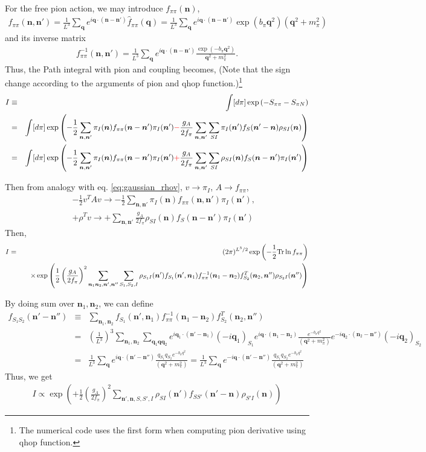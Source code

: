 \documentclass[10pt]{book}
\def\bm{\boldsymbol}
\newcommand{\bea}{\begin{eqnarray}}
\newcommand{\eea}{\end{eqnarray}}
\newcommand{\no}{\nonumber \\}
\def\vn{{\bm n}}
\def\vq{{\bm q}}
\begin{document}
For the free pion action, we may introduce $f_{\pi\pi}(\vn)$,
\bea 
f_{\pi\pi}(\vn,\vn')=\frac{1}{L^3}\sum_\vq e^{i\vq\cdot(\vn-\vn')} \hat{f}_{\pi\pi}(\vq)=
                \frac{1}{L^3}\sum_\vq e^{i\vq\cdot(\vn-\vn')} \exp(b_\pi \vq^2)(\vq^2+m_\pi^2)
\eea 
and its inverse matrix
\bea 
f^{-1}_{\pi\pi}(\vn,\vn')=\frac{1}{L^3}\sum_\vq e^{i\vq\cdot(\vn-\vn')} \frac{\exp(-b_\pi \vq^2)}{\vq^2+m_\pi^2}.
\eea 
Thus, the Path integral with pion and coupling becomes, (Note that the sign change according to the 
arguments of pion and qhop function.)\footnote{
The numerical code uses the first form when computing pion derivative using qhop function.}
\bea  
I&\equiv&\int [d\pi] \exp\left(-S_{\pi\pi}-S_{\pi N}\right) \no 
 &=&  \int [d\pi] \exp\left(-\frac{1}{2}\sum_{\vn,\vn'}\pi_I(\vn)f_{\pi\pi}(\vn-\vn')\pi_I(\vn')
{\color{red} -}\frac{g_A}{2f_\pi}\sum_{\vn,\vn'}\sum_{SI} \pi_I(\vn') f_S(\vn'-\vn)  \rho_{SI}(\vn) 
\right) \no 
  &=& \int [d\pi] \exp\left(-\frac{1}{2}\sum_{\vn,\vn'}\pi_I(\vn)f_{\pi\pi}(\vn-\vn')\pi_I(\vn')
{\color{red} +}\frac{g_A}{2f_\pi}\sum_{\vn,\vn'}\sum_{SI}\rho_{SI}(\vn)f_S(\vn-\vn')\pi_I(\vn')   
\right)
\eea 

Then from analogy with eq. \eqref{eq:gaussian_rhov}, $v\to \pi_I$, $A\to f_{\pi\pi}$,
\bea 
& &-\frac{1}{2}  v^T A v\to -\frac{1}{2} \sum_{\vn,\vn'} \pi_I(\vn) f_{\pi\pi}(\vn,\vn') \pi_I(\vn'),\no 
& &+\rho^T v \to +\sum_{\vn,\vn'} \frac{g_A}{2f_\pi} \rho_{SI}(\vn) f_S(\vn-\vn')\pi_I(\vn') 
\eea 
Then,
\bea 
I &=& (2\pi)^{L^3/2} \exp\left(-\frac{1}{2}{\rm Tr}\ln f_{\pi\pi}\right) 
       \no & &\quad \times 
      	  \exp\left( \frac{1}{2} \left(\frac{g_A}{2f_\pi}\right)^2 \sum_{\vn_1\vn_2,\vn',\vn''}
      	     \sum_{S_1,S_2,I}     	    
      	        \rho_{S_1 I}(\vn')f_{S_1}(\vn',\vn_1)f^{-1}_{\pi\pi}(\vn_1-\vn_2)
      	  	   f^T_{S_2}(\vn_2,\vn'')\rho_{S_2 I}(\vn'') \right) \nonumber 
\eea 

By doing sum over $\vn_1,\vn_2$, we can define
\bea 
f_{S_1 S_2}(\vn'-\vn'')&\equiv &\sum_{\vn_1,\vn_2} f_{S_1}(\vn',\vn_1)f^{-1}_{\pi\pi}(\vn_1-\vn_2)
f^T_{S_2}(\vn_2,\vn'') \no 
&=& \left(\frac{1}{L^3}\right)^3 \sum_{\vn_1,\vn_2}\sum_{\vq_1\vq \vq_2} 
    e^{i\vq_1\cdot(\vn'-\vn_1)} (-i\vq_1)_{S_1}
    e^{i\vq\cdot(\vn_1-\vn_2)} \frac{e^{-b_\pi q^2}}{(\vq^2+m_\pi^2)} 
    e^{-i\vq_2\cdot(\vn_2-\vn'')} (-i\vq_2)_{S_2}
\no 
&=& \frac{1}{L^3}\sum_{\vq} e^{i\vq\cdot(\vn'-\vn'')} \frac{q_{S_1}q_{S_2} e^{-b_\pi q^2}}{(\vq^2+m_\pi^2)}
    =\frac{1}{L^3}\sum_{\vq} e^{-i\vq\cdot(\vn'-\vn'')} \frac{q_{S_1}q_{S_2} e^{-b_\pi q^2}}{(\vq^2+m_\pi^2)}
\eea 
Thus, we get
\bea 
I\propto \exp\left(+\frac{1}{2}\left(\frac{g_A}{2f_\pi}\right)^2\sum_{\vn',\vn,S,S',I} 
              \rho_{SI}(\vn') f_{SS'}(\vn'-\vn) \rho_{S' I}(\vn)\right)
\eea 
\end{document}
